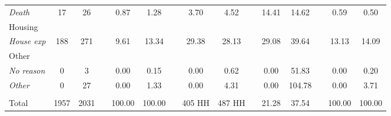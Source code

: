 \begin{table}[htbp]
{\begin{tabular}{lcccccccccccccc}
    \textit{Death} & 17 & 26 &   & 0.87 & 1.28 &   & 3.70 & 4.52 &   & 14.41 & 14.62 &   & 0.59 & 0.50 \\
    Housing &   &   &   &   &   &   &   &   &   &   &   &   &   &  \\
    \textit{House exp} & 188 & 271 &   & 9.61 & 13.34 &   & 29.38 & 28.13 &   & 29.08 & 39.64 &   & 13.13 & 14.09 \\
    Other &   &   &   &   &   &   &   &   &   &   &   &   &   &  \\
    \textit{No reason} & 0 & 3 &   & 0.00 & 0.15 &   & 0.00 & 0.62 &   & 0.00 & 51.83 &   & 0.00 & 0.20 \\
    \textit{Other} & 0 & 27 &   & 0.00 & 1.33 &   & 0.00 & 4.31 &   & 0.00 & 104.78 &   & 0.00 & 3.71 \\
      &   &   &   &   &   &   &   &   &   &   &   &   &   &  \\
    Total & 1957 & 2031 &   & 100.00 & 100.00 &   & 405 HH & 487 HH &   & 21.28 & 37.54 &   & 100.00 & 100.00 \\
    \bottomrule
    \end{tabular}%
	}
  \label{appendix:purpose}%
\end{table}%

